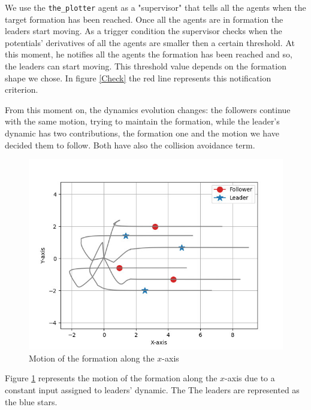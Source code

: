 \documentclass[a4paper,11pt,oneside]{book}
\begin{document}
\bigskip
We use the \texttt{the\_plotter} agent as a "supervisor" that tells all the agents when the target formation has been reached. Once all the agents are in formation the leaders start moving. As a trigger condition the supervisor checks when the potentials' derivatives of all the agents are smaller then a certain threshold. At this moment, he notifies all the agents the formation has been reached and so, the leaders can start moving. This threshold value depends on the formation shape we chose. In figure \ref{Check} the red line represents this notification criterion.

\bigskip
From this moment on, the dynamics evolution changes: the followers continue with the same motion, trying to maintain the formation, while the leader's dynamic has two contributions, the formation one and the motion we have decided them to follow. Both have also the collision avoidance term.

\begin{figure}[h]
\centering
	\includegraphics[scale=0.4]{Moving_hexagon_formation_linear.jpg}
	\caption{Motion of the formation along the $x$-axis}
	\label{Formation_motion_lin}
\end{figure}

Figure \ref{Formation_motion_lin} represents the motion of the formation along the $x$-axis due to a constant input assigned to leaders' dynamic. The The leaders are represented as the blue stars.
\end{document}

